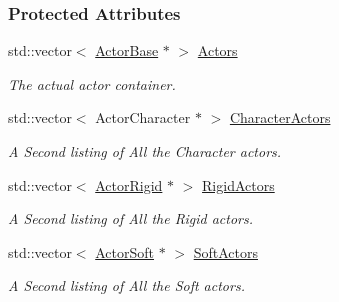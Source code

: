 \subsubsection*{Protected Attributes}
\begin{DoxyCompactItemize}
\item 
\hypertarget{classMezzanine_1_1ActorManager_a12a65a58aab87b083e6718cb8fa3aa2c}{std\-::vector$<$ \hyperlink{classMezzanine_1_1ActorBase}{Actor\-Base} $\ast$ $>$ \hyperlink{classMezzanine_1_1ActorManager_a12a65a58aab87b083e6718cb8fa3aa2c}{Actors}}\label{classMezzanine_1_1ActorManager_a12a65a58aab87b083e6718cb8fa3aa2c}

\begin{DoxyCompactList}\small\item\em The actual actor container. \end{DoxyCompactList}\item 
\hypertarget{classMezzanine_1_1ActorManager_a07fba4f64f1a9162d3a12916d6ef29bd}{std\-::vector$<$ Actor\-Character $\ast$ $>$ \hyperlink{classMezzanine_1_1ActorManager_a07fba4f64f1a9162d3a12916d6ef29bd}{Character\-Actors}}\label{classMezzanine_1_1ActorManager_a07fba4f64f1a9162d3a12916d6ef29bd}

\begin{DoxyCompactList}\small\item\em A Second listing of All the Character actors. \end{DoxyCompactList}\item 
\hypertarget{classMezzanine_1_1ActorManager_a1283d3955dc83831c7687573b6cff206}{std\-::vector$<$ \hyperlink{classMezzanine_1_1ActorRigid}{Actor\-Rigid} $\ast$ $>$ \hyperlink{classMezzanine_1_1ActorManager_a1283d3955dc83831c7687573b6cff206}{Rigid\-Actors}}\label{classMezzanine_1_1ActorManager_a1283d3955dc83831c7687573b6cff206}

\begin{DoxyCompactList}\small\item\em A Second listing of All the Rigid actors. \end{DoxyCompactList}\item 
\hypertarget{classMezzanine_1_1ActorManager_ad3a985b2087fc1353f7d33485589207b}{std\-::vector$<$ \hyperlink{classMezzanine_1_1ActorSoft}{Actor\-Soft} $\ast$ $>$ \hyperlink{classMezzanine_1_1ActorManager_ad3a985b2087fc1353f7d33485589207b}{Soft\-Actors}}\label{classMezzanine_1_1ActorManager_ad3a985b2087fc1353f7d33485589207b}

\begin{DoxyCompactList}\small\item\em A Second listing of All the Soft actors. \end{DoxyCompactList}\end{DoxyCompactItemize}
